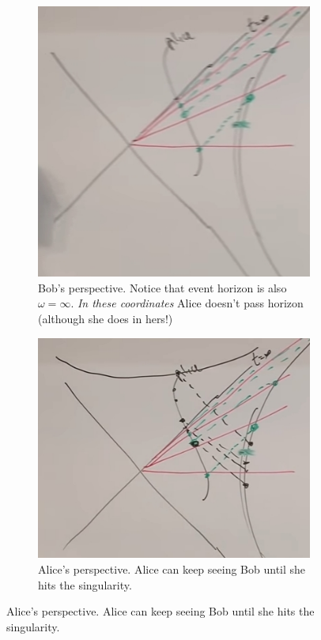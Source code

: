 \documentclass[]{article}
\begin{document}
{ \begin{figure}[H]
 	\caption{Alice falls into the Black Hole}
 	\begin{subfigure}{0.3\textwidth}
 		\caption{Bob's perspective. Notice that event horizon is also $\omega=\infty$. \emph{In these coordinates} Alice doesn't pass horizon (although she does in hers!)}\label{fig:gr-7-alice-falls-in}
 		\includegraphics[width=\textwidth]{gr-7-alice-falls-in}
 	\end{subfigure}
  	\begin{subfigure}{0.3\textwidth}
	 	\caption{Alice's perspective. Alice can keep seeing Bob until she hits the singularity.}\label{fig:gr-7-alice-falls-in-alice-POV}
	 	\includegraphics[width=\textwidth]{gr-7-alice-falls-in-alice-POV}

\end{subfigure}
\end{figure}}
\end{document}
